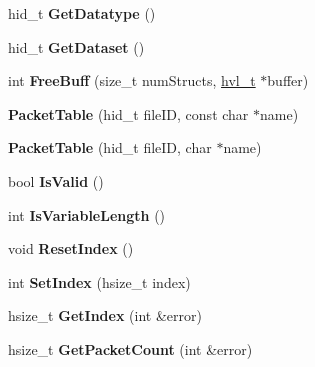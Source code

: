\begin{DoxyCompactItemize}
\mbox{\label{class_packet_table_a4726b9377b162dcf766d54b6eb84cda2}} 
hid\+\_\+t {\bfseries Get\+Datatype} ()
\item 
\mbox{\label{class_packet_table_abdb20b9cf3762510694195a80df5b954}} 
hid\+\_\+t {\bfseries Get\+Dataset} ()
\item 
\mbox{\label{class_packet_table_a80dcdb99ff5b997dbe1b0927e3b01fb8}} 
int {\bfseries Free\+Buff} (size\+\_\+t num\+Structs, \hyperlink{structhvl__t}{hvl\+\_\+t} $\ast$buffer)
\item 
\mbox{\label{class_packet_table_adc377ae43754400a8baa8f63c43764e5}} 
{\bfseries Packet\+Table} (hid\+\_\+t file\+ID, const char $\ast$name)
\item 
\mbox{\label{class_packet_table_a4f86a975d8eeda57128a923b8e4392d8}} 
{\bfseries Packet\+Table} (hid\+\_\+t file\+ID, char $\ast$name)
\item 
\mbox{\label{class_packet_table_acc248d693d8857892ca0c5c1054fe59a}} 
bool {\bfseries Is\+Valid} ()
\item 
\mbox{\label{class_packet_table_a2b0c4db26b9da07b9c4995a310156528}} 
int {\bfseries Is\+Variable\+Length} ()
\item 
\mbox{\label{class_packet_table_ac61620fe96a07c9808c43e4345367cb4}} 
void {\bfseries Reset\+Index} ()
\item 
\mbox{\label{class_packet_table_a4a9440007ef8ac295e5ab63c3a36a70c}} 
int {\bfseries Set\+Index} (hsize\+\_\+t index)
\item 
\mbox{\label{class_packet_table_a98988d2fa8498743bf0776d148ebe783}} 
hsize\+\_\+t {\bfseries Get\+Index} (int \&error)
\item 
\mbox{\label{class_packet_table_a190ab7bcbdbe5829499261e1b0810550}} 
hsize\+\_\+t {\bfseries Get\+Packet\+Count} (int \&error)
\item 
\mbox{\label{class_packet_table_a8a98aeb406cefba65c9dd7d3992f1c1e}} 

\end{DoxyCompactItemize}
